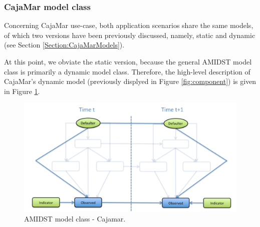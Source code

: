 \subsubsection{CajaMar model class}\label{cajamarAMIDSTModels}
Concerning CajaMar use-case, both application scenarios share the same models, of which two versions have been previously discussed, namely, static and dynamic (see Section \ref{Section:CajaMarModels}). 

At this point, we obviate the static version, because the general AMIDST model class is primarily a dynamic model class. Therefore, the high-level description of CajaMar's dynamic model (previously displyed in Figure \ref{fig:component}) is given in Figure \ref{Figure:AMIDSTModelClassCajamar}. %


\begin{figure}[ht!]
\begin{center}
\includegraphics[scale=0.39]{./figures/AMIDSTModelClassCajamar.png}
\caption{\label{Figure:AMIDSTModelClassCajamar} AMIDST model class - Cajamar.}
\end{center}
\end{figure}


